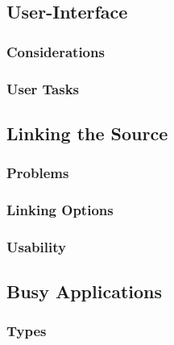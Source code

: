 \subsection{User-Interface}
	\subsubsection{Considerations}
	\subsubsection{User Tasks}
	
\subsection{Linking the Source}
	\subsubsection{Problems}
	
	\subsubsection{Linking Options}
	
	\subsubsection{Usability} 
	
\subsection{Busy Applications}
	\subsubsection{Types}
	
